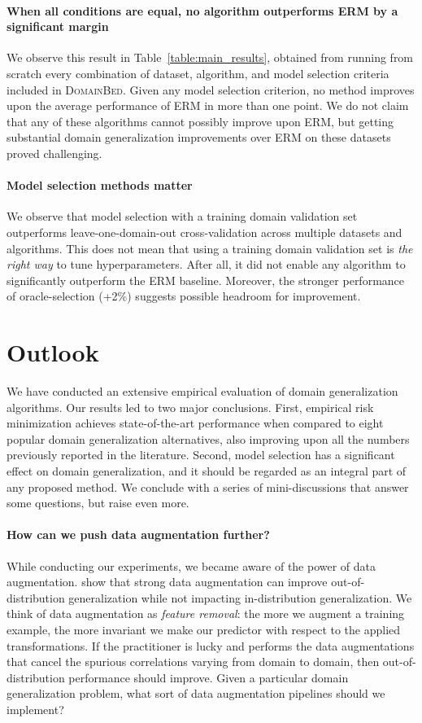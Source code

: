 \documentclass{article}
\newcommand{\domainbed}{\textsc{DomainBed}\xspace}
\begin{document}
\paragraph{When all conditions are equal, no algorithm outperforms ERM by a significant margin}
We observe this result in Table~\ref{table:main_results}, obtained from running from scratch every combination of dataset, algorithm, and model selection criteria included in \domainbed.
Given any model selection criterion, no method improves upon the average performance of ERM in more than one point.
We do not claim that any of these algorithms cannot possibly improve upon ERM, but getting substantial domain generalization improvements over ERM on these datasets proved challenging. 

\paragraph{Model selection methods matter}
We observe that model selection with a training domain validation set outperforms leave-one-domain-out cross-validation across multiple datasets and algorithms.
This does not mean that using a training domain validation set is \emph{the right way} to tune hyperparameters.
After all, it did not enable any algorithm to significantly outperform the ERM baseline.
Moreover, the stronger performance of oracle-selection (+2\%) suggests possible headroom for improvement. 

\section{Outlook}
\label{sec:outlook}

We have conducted an extensive empirical evaluation of domain generalization algorithms.
Our results led to two major conclusions.
First, empirical risk minimization achieves state-of-the-art performance when compared to eight popular domain generalization alternatives, also improving upon all the numbers previously reported in the literature.
Second, model selection has a significant effect on domain generalization, and it should be regarded as an integral part of any proposed method.
We conclude with a series of mini-discussions that answer some questions, but raise even more.

\paragraph{How can we push data augmentation further?}
While conducting our experiments, we became aware of the power of data augmentation.
\citet{zhang2019unseen} show that strong data augmentation can improve out-of-distribution generalization while not impacting in-distribution generalization.
We think of data augmentation as \emph{feature removal}: the more we augment a training example, the more invariant we make our predictor with respect to the applied transformations.
If the practitioner is lucky and performs the data augmentations that cancel the spurious correlations varying from domain to domain, then out-of-distribution performance should improve.
Given a particular domain generalization problem, what sort of data augmentation pipelines should we implement?
\end{document}
